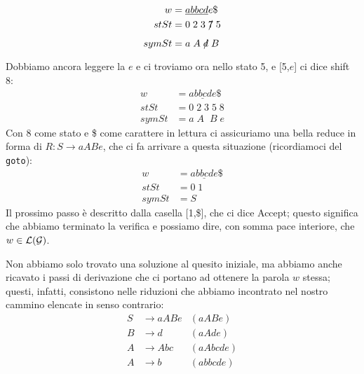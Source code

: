 \documentclass[class=book, crop=false, oneside, 12pt]{standalone}
\begin{document}
\begin{align*}
    w &= \underline{abbcd}e\$ \\
    stSt &= 0\;2\;3\;\xout{7}\;5\\
    symSt &= a\;A\;\xout{d}\;B
\end{align*}
Dobbiamo ancora leggere la \(e\) e ci troviamo ora nello stato 5, e [5,\(e\)] ci dice shift 8:
\begin{align*}
    w &= \underline{abbcde}\$ \\
    stSt &= 0\;2\;3\;5\;8\\
    symSt &= a\;A\;\;B\;e
\end{align*}
Con 8 come stato e \$ come carattere in lettura ci assicuriamo una bella reduce in forma di \(R: S \to aABe\), che ci fa arrivare a questa situazione (ricordiamoci del \texttt{goto}):
\begin{align*}
    w &= \underline{abbcde}\$ \\
    stSt &= 0\;1\\
    symSt &= S
\end{align*}
Il prossimo passo è descritto dalla casella [1,\$], che ci dice Accept; questo significa che abbiamo terminato la verifica e possiamo dire, con somma pace interiore, che \(w \in \mathcal{L}(\mathcal{G})\).

Non abbiamo solo trovato una soluzione al quesito iniziale, ma abbiamo anche ricavato i passi di derivazione che ci portano ad ottenere la parola \(w\) stessa; questi, infatti, consistono nelle riduzioni che abbiamo incontrato nel nostro cammino elencate in senso contrario:
\begin{align*}
    S &\to aABe &(aABe)\\
    B &\to d &(aAde)\\
    A &\to Abc &(aAbcde)\\
    A &\to b &(abbcde)
\end{align*}
\end{document}
